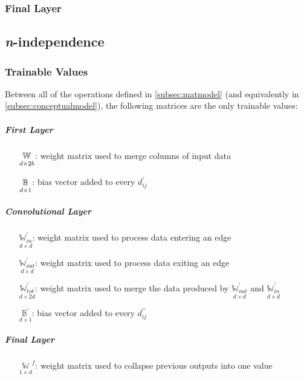 \subsubsection{Final Layer}
\label{subsubsec:matfinallayer}

\subsection{\textit{n}-independence}
\label{subsec:n-independence}
\subsubsection{Trainable Values}
Between all of the operations defined in \ref{subsec:matmodel} (and equivalently 
in \ref{subsec:conceptualmodel}), the following matrices are the only trainable 
values:
\subparagraph{First Layer}
\begin{itemize}
	\item[$\ubb{W}{d}{2b}$:] weight matrix used to merge columns of input data
	\item[$\ubb{B}{d}{1}$:] bias vector added to every $d_{ij}^\prime$
\end{itemize}

\subparagraph{Convolutional Layer}
\begin{itemize}
	\item[$\underset{d \times d}{\mathbb{W}_{in}^\prime}$:] weight matrix used 
		to process data entering an edge
	\item[$\underset{d \times d}{\mathbb{W}_{out}^\prime}$:] weight matrix used 
		to process data exiting an edge
	\item[$\underset{d \times 2d}{\mathbb{W}_{tot}^\prime}$:] weight matrix used 
		to merge the data produced by $\underset{d \times 
			d}{\mathbb{W}_{out}^\prime}$ and $\underset{d \times
			d}{\mathbb{W}_{in}^\prime}$
	\item[$\underset{d \times 1}{\mathbb{B}^\prime}$:] bias vector added to 
		every $d_{ij}^{\prime\prime}$
\end{itemize}

\subparagraph{Final Layer}
\begin{itemize}
	\item[$\underset{1 \times d}{\mathbb{W}}^f$:] weight matrix used to collapse 
		previous outputs into one value
\end{itemize}
